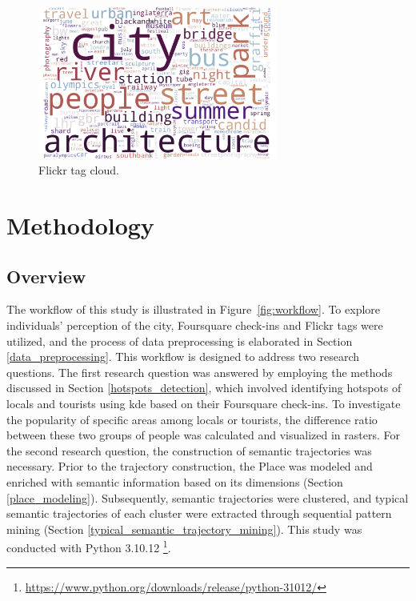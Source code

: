 \documentclass{article}
\theoremstyle{definition}
\theoremstyle{remark}
\begin{document}
\begin{figure}[h!]
\centering
\includegraphics[width=0.7\textwidth]{figures/flickr_tag_cloud.png}
\caption{\label{fig:flickr_tag_cloud}Flickr tag cloud.}
\end{figure}


\clearpage


\section{Methodology}

\subsection{Overview}
The workflow of this study is illustrated in Figure~\ref{fig:workflow}. To explore individuals' perception of the city, Foursquare check-ins and Flickr tags were utilized, and the process of data preprocessing is elaborated in Section \ref{data_preprocessing}. This workflow is designed to address two research questions. The first research question was answered by employing the methods discussed in Section \ref{hotspots_detection}, which involved identifying hotspots of locals and tourists using \acrfull{kde} based on their Foursquare check-ins. To investigate the popularity of specific areas among locals or tourists, the difference ratio between these two groups of people was calculated and visualized in rasters. For the second research question, the construction of semantic trajectories was necessary. Prior to the trajectory construction, the Place was modeled and enriched with semantic information based on its dimensions (Section \ref{place_modeling}). Subsequently, semantic trajectories were clustered, and typical semantic trajectories of each cluster were extracted through sequential pattern mining (Section \ref{typical_semantic_trajectory_mining}). This study was conducted with Python 3.10.12 \footnote{\url{https://www.python.org/downloads/release/python-31012/}}.
\end{document}
